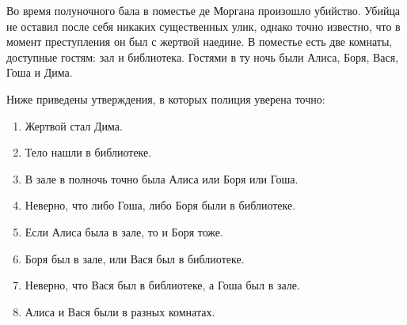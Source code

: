 \begin{Exercise}[counter=SecExercise, label={ex:boolean:investigation}]
    \noindent
    Во время полуночного бала в поместье де Моргана произошло убийство.
    Убийца не оставил после себя никаких существенных улик, однако точно известно, что в момент преступления он был с жертвой наедине.
    В поместье есть две комнаты, доступные гостям: зал и библиотека.
    Гостями в ту ночь были Алиса, Боря, Вася, Гоша и Дима.

    Ниже приведены утверждения, в которых полиция уверена точно:
    \begin{enumerate}
        \item Жертвой стал Дима.
        \item Тело нашли в библиотеке.
        \item В зале в полночь точно была Алиса или Боря или Гоша.
        \item Неверно, что либо Гоша, либо Боря были в библиотеке.
        \item Если Алиса была в зале, то и Боря тоже.
        \item Боря был в зале, или Вася был в библиотеке.
        \item Неверно, что Вася был в библиотеке, а Гоша был в зале.
        \item Алиса и Вася были в разных комнатах.
    \end{enumerate}
\end{Exercise}

